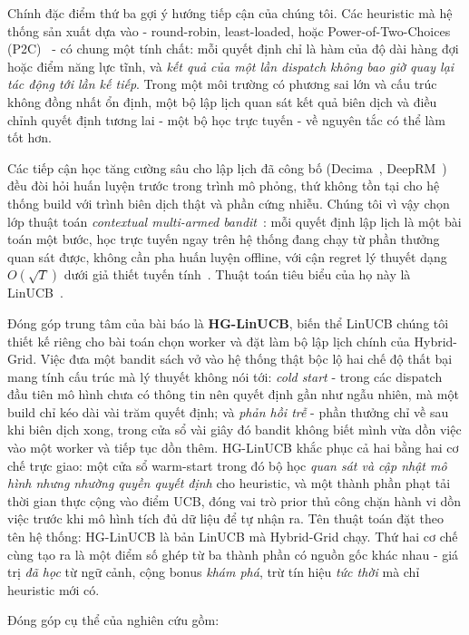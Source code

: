 \documentclass[final,5p,times,twocolumn]{elsarticle}
\begin{document}
Chính đặc điểm thứ ba gợi ý hướng tiếp cận của chúng tôi. Các heuristic mà hệ thống sản xuất dựa vào - round-robin, least-loaded, hoặc Power-of-Two-Choices (P2C)~\cite{mitzenmacher2001} - có chung một tính chất: mỗi quyết định chỉ là hàm của độ dài hàng đợi hoặc điểm năng lực tĩnh, và \emph{kết quả của một lần dispatch không bao giờ quay lại tác động tới lần kế tiếp}. Trong một môi trường có phương sai lớn và cấu trúc không đồng nhất ổn định, một bộ lập lịch quan sát kết quả biên dịch và điều chỉnh quyết định tương lai - một bộ học trực tuyến - về nguyên tắc có thể làm tốt hơn.

Các tiếp cận học tăng cường sâu cho lập lịch đã công bố (Decima~\cite{decima}, DeepRM~\cite{deeprm}) đều đòi hỏi huấn luyện trước trong trình mô phỏng, thứ không tồn tại cho hệ thống build với trình biên dịch thật và phần cứng nhiễu. Chúng tôi vì vậy chọn lớp thuật toán \emph{contextual multi-armed bandit}~\cite{slivkins2019,lattimore2020}: mỗi quyết định lập lịch là một bài toán một bước, học trực tuyến ngay trên hệ thống đang chạy từ phần thưởng quan sát được, không cần pha huấn luyện offline, với cận regret lý thuyết dạng $O(\sqrt{T})$ dưới giả thiết tuyến tính~\cite{chu2011}. Thuật toán tiêu biểu của họ này là LinUCB~\cite{li2010}.

Đóng góp trung tâm của bài báo là \textbf{HG-LinUCB}, biến thể LinUCB chúng tôi thiết kế riêng cho bài toán chọn worker và đặt làm bộ lập lịch chính của Hybrid-Grid. Việc đưa một bandit sách vở vào hệ thống thật bộc lộ hai chế độ thất bại mang tính cấu trúc mà lý thuyết không nói tới: \emph{cold start} - trong các dispatch đầu tiên mô hình chưa có thông tin nên quyết định gần như ngẫu nhiên, mà một build chỉ kéo dài vài trăm quyết định; và \emph{phản hồi trễ} - phần thưởng chỉ về sau khi biên dịch xong, trong cửa sổ vài giây đó bandit không biết mình vừa dồn việc vào một worker và tiếp tục dồn thêm. HG-LinUCB khắc phục cả hai bằng hai cơ chế trực giao: một cửa sổ warm-start trong đó bộ học \emph{quan sát và cập nhật mô hình nhưng nhường quyền quyết định} cho heuristic, và một thành phần phạt tải thời gian thực cộng vào điểm UCB, đóng vai trò prior thủ công chặn hành vi dồn việc trước khi mô hình tích đủ dữ liệu để tự nhận ra. Tên thuật toán đặt theo tên hệ thống: HG-LinUCB là bản LinUCB mà Hybrid-Grid chạy. Thứ hai cơ chế cùng tạo ra là một điểm số ghép từ ba thành phần có nguồn gốc khác nhau - giá trị \emph{đã học} từ ngữ cảnh, cộng bonus \emph{khám phá}, trừ tín hiệu \emph{tức thời} mà chỉ heuristic mới có.

Đóng góp cụ thể của nghiên cứu gồm:
\end{document}
